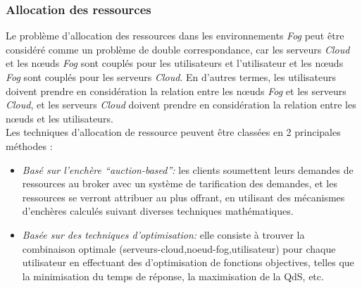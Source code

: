 \subsubsection{Allocation des ressources}
Le problème d'allocation des ressources dans les environnements \emph{Fog} peut être considéré comme un problème de double correspondance, car les serveurs \emph{Cloud} et les nœuds \emph{Fog} sont couplés pour les utilisateurs et l'utilisateur et les nœuds \emph{Fog} sont couplés pour les serveurs \emph{Cloud}. En d'autres termes, les utilisateurs doivent prendre en considération la relation entre les nœuds \emph{Fog} et les serveurs \emph{Cloud}, et les serveurs \emph{Cloud} doivent prendre en considération la relation entre les nœuds et les utilisateurs.\\ 
Les techniques d'allocation de ressource peuvent être classées en 2 principales méthodes :
\begin{itemize}
  \item \emph{Basé sur l'enchère “auction-based”:} les clients soumettent leurs demandes de ressources au broker avec un système de tarification des demandes, et les ressources se verront attribuer au plus offrant, en utilisant des mécanismes d'enchères calculés suivant diverses techniques mathématiques.
  \item \emph{Basée sur des techniques d'optimisation:} elle consiste à trouver la combinaison optimale (serveurs-cloud,noeud-fog,utilisateur) pour chaque utilisateur en effectuant des d'optimisation de fonctions objectives, telles que la minimisation du temps de réponse, la maximisation de la QdS, etc.
\end{itemize}

